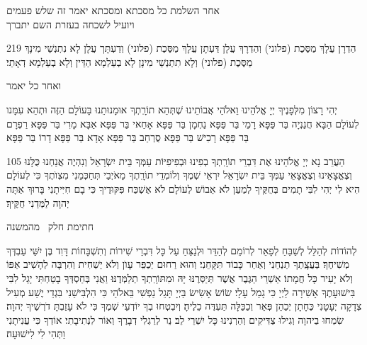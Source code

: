 \clearpage

\centerlastline
\small
\parskip 1pt
{\centering
  \scriptsize
   אחר השלמת כל מסכתא ומסכתא יאמר זה שלש פעמים\\ ויועיל לשכחה בעזרת השם יתברך\hdot
}

\begin{tp}{219}
הַדְרָן עֲלָךְ מַסֶּכֶת {\scriptsize(פלוני)} וְהַדְרָךְ עֲלָן\hdot
דַּעְתָן עֲלָךְ מַסֶּכֶת {\scriptsize(פלוני)} וְדַעְתָּך עֲלָן\hdot
לָא נִתְנְשֵׁי מִינָךְ מַסֶּכֶת {\scriptsize(פלוני}) וְלָא תִתְנְשֵׁי מִינָן
לָא בְעַלְמָא הַדֵּין וְלָא בְעַלְמָא דְאָתֵי׃
\end{tp}

{\scriptsize ואחר כל יאמר}

יְהִי רָצוֹן מִלְּפָנֶיךָ יְיָ אֱלֹהֵינוּ וֵאלֹהֵי אֲבוֹתֵינוּ שֶׁתְּהֵא תוֹרָֽתְךָ אוּמָנוּתֵנוּ בָּעוֹלָם הַזֶּה וּתְהֵא עִמָּנו לְעוֹלָם הַבָּא\hdot
חֲנַנְיָה בַּר פַּפָּא\hdot
רָמֵי בַּר פַּפָּא\hdot
נַחְמָן בַּר פַּפָּא\hdot
אָחַאי בַּר פַּפָּא\hdot
אַבָּא מָרִי בַּר פַּפָּא\hdot
רַפְרָם בַּר פַּפָּא\hdot
רָכִישׁ בַּר פַּפָּא\hdot
סֻרְחַב בַּר פַּפָּא\hdot
אָדָא בַּר פַּפָּא\hdot
דָרוֹ בַּר פַּפָּא׃

\begin{tp}{105}
הַעֲרֵב נָא יְיָ אֱלֹהֵינוּ אֶת דִּבְרֵי תוֹרָֽתְךָ בְפִינוּ וּבְפִיפִיּוֹת עַמְּךָ בֵּית יִשְׂרָאֵל וְנִהְיֶה אֲנַחְנוּ כֻּלָּנוּ וְצֶאֱצָאֵינוּ וְצֶאֱצָאֵי עַמְּךָ בֵּית יִשְׂרָאֵל יִרְאֵי שְׁמֶךָ וְלוֹמְדֵי תוֹרָֽתֶךָ\hdot
 מֵאֹיְבַי תְּחַכְּמֵנִי מִצְוֺתֶךָ כִּי לְעוֹלָם הִיא לִי\hdot
 יְהִי לִבִּי תָמִים בְּחֻקֶּיךָ לְמַעַן לֹא אֵבוֹשׁ\hdot
 לְעוֹלָם לֹא אֶשְׁכַּח פִּקּוּדֶיךָ כִּי בָם חִיִּיתָנִי\hdot
  בָּרוּךְ אַתָּה יְהוָה לַמְּדֵנִי חֻקֶּיךָ׃
\end{tp}
  
    {\centering
      \larger חתימת חלק  \sederCount\ מהמשנה 

    }

    לְהוֹדוֹת לְהַלֵּל לְשַׁבֵּחַ לְפָאֵר לְרוֹמֵם לְהַדֵּר וּלְנַצֵּחַ עַל כָּל דִּבְרֵי שִׁירוֹת וְתִשְׁבָּחוֹת דָּוִד בֶּן יִשַּׁי עַבְדְּךָ מְשִׁיחֶךָ׃ בַּעֲצָֽתְךָ תַנְחֵנִי וְאַחַר כָּבוֹד תִּקָּחֵנִי׃
    וְהוּא רַחוּם יְכַפֵּר עָוֺן וְלֹא יַשְׁחִית וְהִרְבָּה לְהָשִׁיב אַפּוֹ וְלֹא יָעִיר כָּל חֲמָתוֹ׃
    אַשְׁרֵי הַגֶּבֶר אֲשֶׁר תְּיַסְּרֶנּוּ יָּהּ וּמִתּוֹרָֽתְךָ תְלַמְּדֶנּוּ׃
    וַאֲנִי בְּחַסְדְּךָ בָטַחְתִּי יָגֵל לִבִּי בִּישׁוּעָתֶךָ אָשִׁירָה לַיְיָ כִּי גָמַל עָלָי׃
    שׂוֹשׂ אָשִׂישׂ בַּיְיָ תָּגֵל נַפְשִׁי בֵּאלֹהַי כִּי הִלְבִּישַׁנִי בִּגְדֵי יֶשַׁע מְעִיל צְדָקָה יְעָטָנִי כֶּחָתָן יְכַהֵן פְּאֵר וְכַכַּלָּה תַּעְדֶּה כֵלֶיהָ׃
    וְיִבְטְחוּ בְךָ יוֹדְעֵי שְׁמֶךָ כִּי לֹא עָזַבְתָּ דֹרְשֶׁיךָ יְהוָה׃
    שִׂמְחוּ בַיהוָה וְגִילוּ צַדִּיקִים וְהַרְנִינוּ כָּל יִשְׁרֵי לֵב׃
    נֵר לְרַגְלִי דְבָרֶךָ וְאוֹר לִנְתִיבָתִי׃
    אוֹדְךָ כִּי עֲנִיתָנִי וַתְּהִי לִי לִישׁוּעָה׃
    
